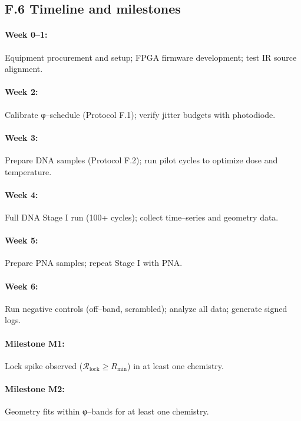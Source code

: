 \documentclass[11pt]{article}
\begin{document}
\subsection*{F.6 Timeline and milestones}

\paragraph{Week 0–1:} Equipment procurement and setup; FPGA firmware development; test IR source alignment.

\paragraph{Week 2:} Calibrate φ–schedule (Protocol F.1); verify jitter budgets with photodiode.

\paragraph{Week 3:} Prepare DNA samples (Protocol F.2); run pilot cycles to optimize dose and temperature.

\paragraph{Week 4:} Full DNA Stage I run (100+ cycles); collect time–series and geometry data.

\paragraph{Week 5:} Prepare PNA samples; repeat Stage I with PNA.

\paragraph{Week 6:} Run negative controls (off–band, scrambled); analyze all data; generate signed logs.

\paragraph{Milestone M1:} Lock spike observed ($\mathcal{R}_{\mathrm{lock}}\ge R_{\min}$) in at least one chemistry.

\paragraph{Milestone M2:} Geometry fits within φ–bands for at least one chemistry.
\end{document}
